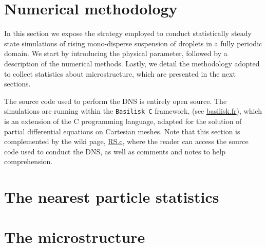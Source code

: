 \documentclass[11pt]{My_preprint}
\begin{document}


\section{Numerical methodology}
\label{sec:methodo}
In this section we expose the strategy employed to conduct statistically steady state simulations of rising mono-disperse suspension of droplets in a fully periodic domain. 
We start by introducing the physical parameter, followed by a description of the numerical methods.
Lastly, we detail the methodology adopted to collect statistics about microstructure, which are presented in the next sections.

The source code used to perform the DNS is entirely open source.
The simulations are running within the \texttt{Basilisk C} framework, (see \href{http://basilisk.fr}{basilisk.fr}), which is an extension of the C programming language, adapted for the solution of partial differential equations on Cartesian meshes. 
Note that this section is complemented by the wiki page, \href{http://basilisk.fr/sandbox/fintzin/Rising-Suspenion/RS.c}{RS.c}, where the reader can access the source code used to conduct the DNS, as well as comments and notes to help comprehension. 








\section{The nearest particle statistics}




\section{The microstructure}
\label{sec:microstructure}



%


%
\end{document}
